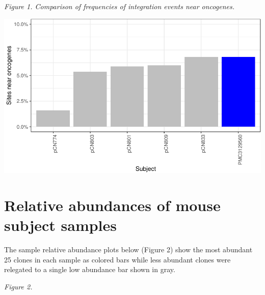 \documentclass[12pt,]{article}
\begin{document}
\vspace{1.0cm}

\emph{Figure 1. Comparison of frequencies of integration events near
oncogenes.}

\vspace{0.5cm}

\includegraphics{project.group2_files/figure-latex/fig1-1.pdf}

\newpage

\section{Relative abundances of mouse subject
samples}\label{relative-abundances-of-mouse-subject-samples}

The sample relative abundance plots below (Figure 2) show the most
abundant 25 clones in each sample as colored bars while less abundant
clones were relegated to a single low abundance bar shown in gray.

\vspace{0.5cm}

\emph{Figure 2.}

\vspace{0.5cm}
\end{document}
